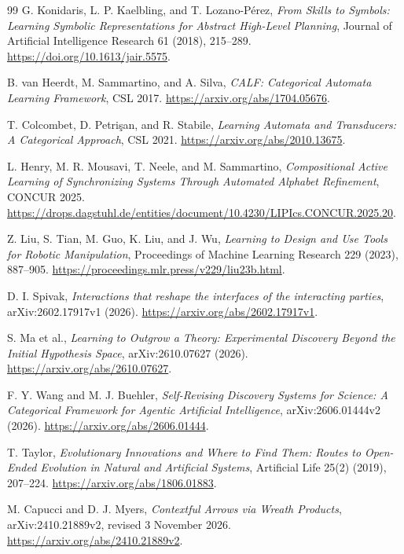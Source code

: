 \documentclass[11pt]{article}
\theoremstyle{definition}
\theoremstyle{remark}
\begin{document}
\begin{thebibliography}{99}
G. Konidaris, L. P. Kaelbling, and T. Lozano-P\'erez,
\emph{From Skills to Symbols: Learning Symbolic Representations for
Abstract High-Level Planning},
Journal of Artificial Intelligence Research 61 (2018), 215--289.
\url{https://doi.org/10.1613/jair.5575}.

B. van Heerdt, M. Sammartino, and A. Silva,
\emph{CALF: Categorical Automata Learning Framework}, CSL 2017.
\url{https://arxiv.org/abs/1704.05676}.

T. Colcombet, D. Petri\c{s}an, and R. Stabile,
\emph{Learning Automata and Transducers: A Categorical Approach},
CSL 2021.
\url{https://arxiv.org/abs/2010.13675}.

L. Henry, M. R. Mousavi, T. Neele, and M. Sammartino,
\emph{Compositional Active Learning of Synchronizing Systems Through
Automated Alphabet Refinement}, CONCUR 2025.
\url{https://drops.dagstuhl.de/entities/document/10.4230/LIPIcs.CONCUR.2025.20}.

Z. Liu, S. Tian, M. Guo, K. Liu, and J. Wu,
\emph{Learning to Design and Use Tools for Robotic Manipulation},
Proceedings of Machine Learning Research 229 (2023), 887--905.
\url{https://proceedings.mlr.press/v229/liu23b.html}.

D. I. Spivak, \emph{Interactions that reshape the interfaces of the
interacting parties}, arXiv:2602.17917v1 (2026).
\url{https://arxiv.org/abs/2602.17917v1}.

S. Ma et al., \emph{Learning to Outgrow a Theory: Experimental Discovery
Beyond the Initial Hypothesis Space}, arXiv:2610.07627 (2026).
\url{https://arxiv.org/abs/2610.07627}.

F. Y. Wang and M. J. Buehler,
\emph{Self-Revising Discovery Systems for Science: A Categorical
Framework for Agentic Artificial Intelligence},
arXiv:2606.01444v2 (2026).
\url{https://arxiv.org/abs/2606.01444}.

T. Taylor, \emph{Evolutionary Innovations and Where to Find Them:
Routes to Open-Ended Evolution in Natural and Artificial Systems},
Artificial Life 25(2) (2019), 207--224.
\url{https://arxiv.org/abs/1806.01883}.

M. Capucci and D. J. Myers,
\emph{Contextful Arrows via Wreath Products},
arXiv:2410.21889v2, revised 3 November 2026.
\url{https://arxiv.org/abs/2410.21889v2}.

\end{thebibliography}
\end{document}
